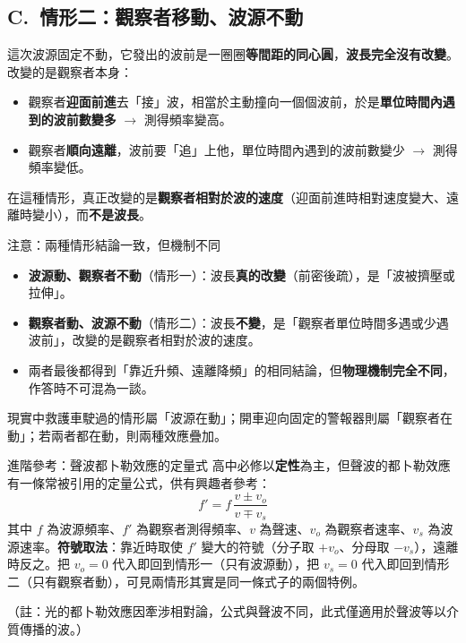 \documentclass[11pt]{article}
\begin{document}
\subsection*{\sffamily C.\ 情形二：觀察者移動、波源不動}

這次波源固定不動，它發出的波前是一圈圈\textbf{等間距的同心圓}，\textbf{波長完全沒有改變}。改變的是觀察者本身：

\begin{itemize}\setlength{\itemsep}{1pt}
\item 觀察者\textbf{迎面前進}去「接」波，相當於主動撞向一個個波前，於是\textbf{單位時間內遇到的波前數變多} $\rightarrow$ 測得頻率變高。
\item 觀察者\textbf{順向遠離}，波前要「追」上他，單位時間內遇到的波前數變少 $\rightarrow$ 測得頻率變低。
\end{itemize}

在這種情形，真正改變的是\textbf{觀察者相對於波的速度}（迎面前進時相對速度變大、遠離時變小），而\textbf{不是波長}。


\begin{補充框}{注意：兩種情形結論一致，但機制不同}
\begin{itemize}\setlength{\itemsep}{1pt}
\item \textbf{波源動、觀察者不動}（情形一）：波長\textbf{真的改變}（前密後疏），是「波被擠壓或拉伸」。
\item \textbf{觀察者動、波源不動}（情形二）：波長\textbf{不變}，是「觀察者單位時間多遇或少遇波前」，改變的是觀察者相對於波的速度。
\item 兩者最後都得到「靠近升頻、遠離降頻」的相同結論，但\textbf{物理機制完全不同}，作答時不可混為一談。
\end{itemize}
現實中救護車駛過的情形屬「波源在動」；開車迎向固定的警報器則屬「觀察者在動」；若兩者都在動，則兩種效應疊加。
\end{補充框}

\begin{延伸框}{進階參考：聲波都卜勒效應的定量式}
高中必修以\textbf{定性}為主，但聲波的都卜勒效應有一條常被引用的定量公式，供有興趣者參考：
$$f'=f\,\dfrac{v\pm v_o}{v\mp v_s}$$
其中 $f$ 為波源頻率、$f'$ 為觀察者測得頻率、$v$ 為聲速、$v_o$ 為觀察者速率、$v_s$ 為波源速率。\textbf{符號取法}：靠近時取使 $f'$ 變大的符號（分子取 $+v_o$、分母取 $-v_s$），遠離時反之。把 $v_o=0$ 代入即回到情形一（只有波源動），把 $v_s=0$ 代入即回到情形二（只有觀察者動），可見兩情形其實是同一條式子的兩個特例。

（註：光的都卜勒效應因牽涉相對論，公式與聲波不同，此式僅適用於聲波等以介質傳播的波。）
\end{延伸框}
\end{document}
